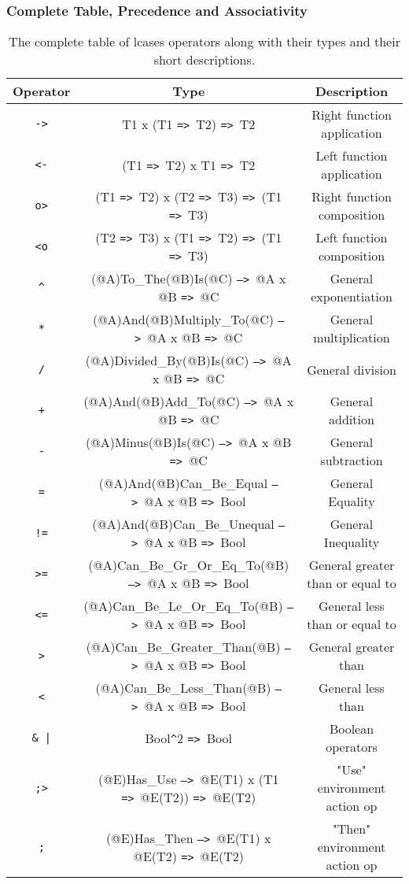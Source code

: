 \documentclass{article}
\def\ra{\texttt{=>}\ }
\def\Ra{\texttt{-->}\ }
\begin{document}
\newpage
\subsubsection{Complete Table, Precedence and Associativity}

\begin{table}[h]

\caption{
The complete table of lcases operators along with their types and 
their short descriptions.
}

\begin{center}
\begin{tabular}{ |c|c|c| } 
\hline
Operator & Type & Description \\ 
\hline
\hline
\texttt{->} & T1 x (T1 \ra T2) \ra T2 & Right function application \\
\hline
\texttt{<-} & (T1 \ra T2) x T1 \ra T2 & Left function application \\
\hline
\texttt{o>} & (T1 \ra T2) x (T2 \ra T3) \ra (T1 \ra T3) & Right function composition
\\
\hline
\texttt{<o} & (T2 \ra T3) x (T1 \ra T2) \ra (T1 \ra T3) & Left function composition
\\
\hline
\texttt{\^} & (@A)To_The(@B)Is(@C) \Ra @A x @B \ra @C & General exponentiation
\\
\hline
\texttt{*} & (@A)And(@B)Multiply_To(@C) \Ra @A x @B \ra @C & General multiplication
\\
\hline
\texttt{/} & (@A)Divided_By(@B)Is(@C) \Ra @A x @B \ra @C & General division \\
\hline
\texttt{+} & (@A)And(@B)Add_To(@C) \Ra @A x @B \ra @C & General addition \\ 
\hline
\texttt{-} & (@A)Minus(@B)Is(@C) \Ra @A x @B \ra @C & General subtraction \\
\hline
\texttt{=} & (@A)And(@B)Can_Be_Equal \Ra @A x @B \ra Bool & General Equality \\
\hline
\texttt{!=} & (@A)And(@B)Can_Be_Unequal \Ra @A x @B \ra Bool & General Inequality \\
\hline
\texttt{>=} & (@A)Can_Be_Gr_Or_Eq_To(@B) \Ra @A x @B \ra Bool
& General greater than or equal to \\
\hline
\texttt{<=} & (@A)Can_Be_Le_Or_Eq_To(@B) \Ra @A x @B \ra Bool
& General less than or equal to \\
\hline
\texttt{>} & (@A)Can_Be_Greater_Than(@B) \Ra @A x @B \ra Bool & General greater than \\
\hline
\texttt{<} & (@A)Can_Be_Less_Than(@B) \Ra @A x @B \ra Bool & General less than \\
\hline
\texttt{\& |} & Bool\texttt{\^}2 \ra Bool & Boolean operators \\
\hline
\texttt{;>} & (@E)Has_Use \Ra @E(T1) x (T1 \ra @E(T2)) \ra @E(T2) &
"Use" environment action op  \\
\hline
\texttt{;} & (@E)Has_Then \Ra @E(T1) x @E(T2) \ra @E(T2) &
"Then" environment action op \\
\hline
\end{tabular}
\end{center}

\label{table:allops}

\end{table}
\end{document}
